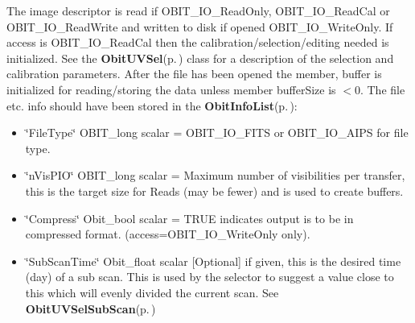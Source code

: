 The image descriptor is read if OBIT\_\-IO\_\-Read\-Only, OBIT\_\-IO\_\-Read\-Cal or OBIT\_\-IO\_\-Read\-Write and written to disk if opened OBIT\_\-IO\_\-Write\-Only. If access is OBIT\_\-IO\_\-Read\-Cal then the calibration/selection/editing needed is initialized. See the {\bf Obit\-UVSel}{\rm (p.\,\pageref{structObitUVSel})} class for a description of the selection and calibration parameters. After the file has been opened the member, buffer is initialized for reading/storing the data unless member buffer\-Size is $<$0. The file etc. info should have been stored in the {\bf Obit\-Info\-List}{\rm (p.\,\pageref{structObitInfoList})}: \begin{itemize}
\item \char`\"{}File\-Type\char`\"{} OBIT\_\-long scalar = OBIT\_\-IO\_\-FITS or OBIT\_\-IO\_\-AIPS for file type. \item \char`\"{}n\-Vis\-PIO\char`\"{} OBIT\_\-long scalar = Maximum number of visibilities per transfer, this is the target size for Reads (may be fewer) and is used to create buffers. \item \char`\"{}Compress\char`\"{} Obit\_\-bool scalar = TRUE indicates output is to be in compressed format. (access=OBIT\_\-IO\_\-Write\-Only only). \item \char`\"{}Sub\-Scan\-Time\char`\"{} Obit\_\-float scalar [Optional] if given, this is the desired time (day) of a sub scan. This is used by the selector to suggest a value close to this which will evenly divided the current scan. See {\bf Obit\-UVSel\-Sub\-Scan}{\rm (p.\,\pageref{ObitUVSel_8c_a21})} 
\end{itemize}
